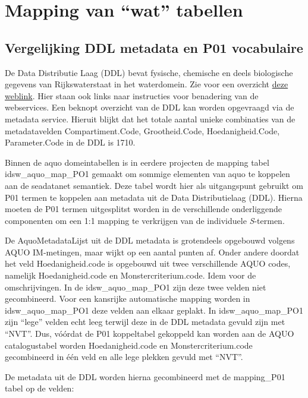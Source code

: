 \documentclass[
]{book}
\begin{document}
\hypertarget{mapping-van-wat-tabellen}{%
\chapter{Mapping van ``wat'' tabellen}\label{mapping-van-wat-tabellen}}

\hypertarget{vergelijking-ddl-metadata-en-p01-vocabulaire}{%
\section{Vergelijking DDL metadata en P01 vocabulaire}\label{vergelijking-ddl-metadata-en-p01-vocabulaire}}

De Data Distributie Laag (DDL) bevat fysische, chemische en deels biologische gegevens van Rijkswaterstaat in het waterdomein. Zie voor een overzicht \href{https://rijkswaterstaatdata.nl/waterdata/}{deze weblink}. Hier staan ook links naar instructies voor benadering van de webservices. Een beknopt overzicht van de DDL kan worden opgevraagd via de metadata service. Hieruit blijkt dat het totale aantal unieke combinaties van de metadatavelden Compartiment.Code, Grootheid.Code, Hoedanigheid.Code, Parameter.Code in de DDL is 1710.

Binnen de aquo domeintabellen is in eerdere projecten de mapping tabel idsw\_aquo\_map\_PO1 gemaakt om sommige elementen van aquo te koppelen aan de seadatanet semantiek. Deze tabel wordt hier als uitgangspunt gebruikt om P01 termen te koppelen aan metadata uit de Data Distributielaag (DDL). Hierna moeten de P01 termen uitgesplitst worden in de verschillende onderliggende componenten om een 1:1 mapping te verkrijgen van de individuele \emph{S}-termen.

De AquoMetadataLijst uit de DDL metadata is grotendeels opgebouwd volgens AQUO IM-metingen, maar wijkt op een aantal punten af. Onder andere doordat het veld Hoedanigheid.code is opgebouwd uit twee verschillende AQUO codes, namelijk Hoedanigheid.code en Monstercriterium.code. Idem voor de omschrijvingen. In de idsw\_aquo\_map\_PO1 zijn deze twee velden niet gecombineerd. Voor een kansrijke automatische mapping worden in idsw\_aquo\_map\_PO1 deze velden aan elkaar geplakt. In idsw\_aquo\_map\_PO1 zijn ``lege'' velden echt leeg terwijl deze in de DDL metadata gevuld zijn met ``NVT''. Dus, vóórdat de P01 koppeltabel gekoppeld kan worden aan de AQUO catalogustabel worden Hoedanigheid.code en Monstercriterium.code gecombineerd in één veld en alle lege plekken gevuld met ``NVT''.

De metadata uit de DDL worden hierna gecombineerd met de mapping\_P01 tabel op de velden:
\end{document}
